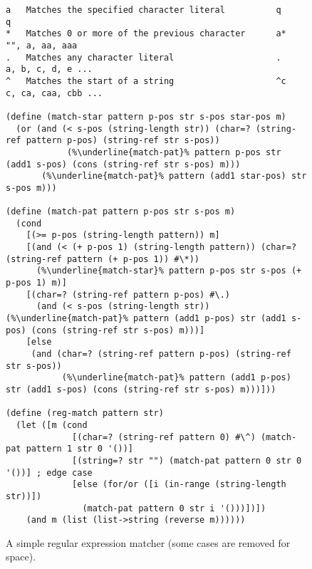 \begin{figure}[h!]
  \footnotesize
  \begin{minipage}{1.1\textwidth}
\begin{lstlisting}[mathescape,escapechar=\%,language=racket]
a 	Matches the specified character literal          q       q
* 	Matches 0 or more of the previous character      a*      "", a, aa, aaa
. 	Matches any character literal                    .       a, b, c, d, e ...
^ 	Matches the start of a string                    ^c      c, ca, caa, cbb ...

(define (match-star pattern p-pos str s-pos star-pos m)
  (or (and (< s-pos (string-length str)) (char=? (string-ref pattern p-pos) (string-ref str s-pos))
            (%\underline{match-pat}% pattern p-pos str (add1 s-pos) (cons (string-ref str s-pos) m)))
       (%\underline{match-pat}% pattern (add1 star-pos) str s-pos m)))

(define (match-pat pattern p-pos str s-pos m)
  (cond
    [(>= p-pos (string-length pattern)) m]
    [(and (< (+ p-pos 1) (string-length pattern)) (char=? (string-ref pattern (+ p-pos 1)) #\*))
      (%\underline{match-star}% pattern p-pos str s-pos (+ p-pos 1) m)]
    [(char=? (string-ref pattern p-pos) #\.)
      (and (< s-pos (string-length str)) (%\underline{match-pat}% pattern (add1 p-pos) str (add1 s-pos) (cons (string-ref str s-pos) m)))]
    [else
     (and (char=? (string-ref pattern p-pos) (string-ref str s-pos))
           (%\underline{match-pat}% pattern (add1 p-pos) str (add1 s-pos) (cons (string-ref str s-pos) m)))]))

(define (reg-match pattern str)
  (let ([m (cond
             [(char=? (string-ref pattern 0) #\^) (match-pat pattern 1 str 0 '())]
             [(string=? str "") (match-pat pattern 0 str 0 '())] ; edge case
             [else (for/or ([i (in-range (string-length str))])
               (match-pat pattern 0 str i '()))])])
    (and m (list (list->string (reverse m))))))
\end{lstlisting}
\end{minipage}
\caption{A simple regular expression matcher (some cases are removed for space).}
\label{fig:regexp}
\vspace{-0.3cm}
\end{figure}